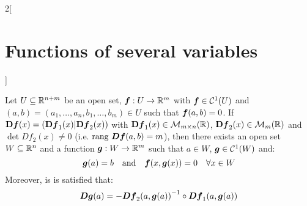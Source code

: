 \documentclass[../../../main.tex]{subfiles}
\begin{document}
\begin{multicols}{2}[\section{Functions of several variables}]
\begin{theorem}
    Let $U\subseteq\mathbb{R}^{n+m}$ be an open set, $\boldsymbol{f}:U\rightarrow\mathbb{R}^m$ with $\boldsymbol{f}\in \mathcal{C}^1(U)$ and $(a,b)=(a_1,\ldots,a_n,b_1,\ldots,b_m)\in U$ such that $\boldsymbol{f}(a,b)=0$. If $\vb{D}\boldsymbol{f}(x)=(\vb{D}\boldsymbol{f}_1(x)|\vb{D}\boldsymbol{f}_2(x))$ with $\vb{D}\boldsymbol{f}_1(x)\in\mathcal{M}_{m\times n}(\mathbb{R} )$, $\vb{D}\boldsymbol{f}_2(x)\in\mathcal{M}_m(\mathbb{R} )$ and $\det Df_2(x)\ne 0$ (i.e. $\text{rang }\boldsymbol{Df}(a,b)=m$), then there exists an open set $W\subseteq\mathbb{R}^n$ and a function $\boldsymbol{g}:W\rightarrow\mathbb{R}^m$ such that $a\in W$, $\boldsymbol{g}\in\mathcal{C}^1(W)$ and: $$\boldsymbol{g}(a)=b\quad\text{and}\quad \boldsymbol{f}(x,\boldsymbol{g}(x))=0\quad\forall x\in W$$ Moreover, is is satisfied that: $$\boldsymbol{Dg}(a)=-{\boldsymbol{Df}_2(a,\boldsymbol{g}(a))}^{-1}\circ \boldsymbol{Df}_1(a,\boldsymbol{g}(a))$$
  \end{theorem}

\end{multicols}
\end{document}
